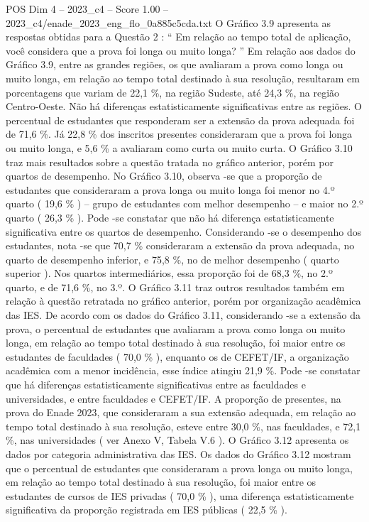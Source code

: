 \begin{textsample}{POS Dim 4 – 2023\_c4 – Score 1.00 – 2023\_c4/enade\_2023\_eng\_flo\_0a885c5cda.txt}
O Gráfico 3.9 apresenta as respostas obtidas para a Questão 2 : “ Em relação ao tempo total de aplicação, você considera que a prova foi longa ou muito longa? ” Em relação aos dados do Gráfico 3.9, entre as grandes regiões, os que avaliaram a prova como longa ou muito longa, em relação ao tempo total destinado à sua resolução, resultaram em porcentagens que variam de 22,1 \%, na região Sudeste, até 24,3 \%, na região Centro-Oeste.
Não há diferenças estatisticamente significativas entre as regiões.
O percentual de estudantes que responderam ser a extensão da prova adequada foi de 71,6 \%.
Já 22,8 \% dos inscritos presentes consideraram que a prova foi longa ou muito longa, e 5,6 \% a avaliaram como curta ou muito curta.
O Gráfico 3.10 traz mais resultados sobre a questão tratada no gráfico anterior, porém por quartos de desempenho.
No Gráfico 3.10, observa -se que a proporção de estudantes que consideraram a prova longa ou muito longa foi menor no 4.º quarto ( 19,6 \% ) – grupo de estudantes com melhor desempenho – e maior no 2.º quarto ( 26,3 \% ).
Pode -se constatar que não há diferença estatisticamente significativa entre os quartos de desempenho.
Considerando -se o desempenho dos estudantes, nota -se que 70,7 \% consideraram a extensão da prova adequada, no quarto de desempenho inferior, e 75,8 \%, no de melhor desempenho ( quarto superior ).
Nos quartos intermediários, essa proporção foi de 68,3 \%, no 2.º quarto, e de 71,6 \%, no 3.º.
O Gráfico 3.11 traz outros resultados também em relação à questão retratada no gráfico anterior, porém por organização acadêmica das IES.
De acordo com os dados do Gráfico 3.11, considerando -se a extensão da prova, o percentual de estudantes que avaliaram a prova como longa ou muito longa, em relação ao tempo total destinado à sua resolução, foi maior entre os estudantes de faculdades ( 70,0 \% ), enquanto os de CEFET/IF, a organização acadêmica com a menor incidência, esse índice atingiu 21,9 \%.
Pode -se constatar que há diferenças estatisticamente significativas entre as faculdades e universidades, e entre faculdades e CEFET/IF.
A proporção de presentes, na prova do Enade 2023, que consideraram a sua extensão adequada, em relação ao tempo total destinado à sua resolução, esteve entre 30,0 \%, nas faculdades, e 72,1 \%, nas universidades ( ver Anexo V, Tabela V.6 ).
O Gráfico 3.12 apresenta os dados por categoria administrativa das IES.
Os dados do Gráfico 3.12 mostram que o percentual de estudantes que consideraram a prova longa ou muito longa, em relação ao tempo total destinado à sua resolução, foi maior entre os estudantes de cursos de IES privadas ( 70,0 \% ), uma diferença estatisticamente significativa da proporção registrada em IES públicas ( 22,5 \% ).

\end{textsample}
